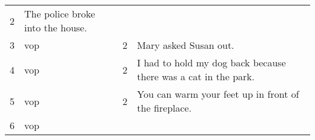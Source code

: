 \documentclass[authoryear,a4paper, 14pt]{scrartcl}
\begin{document}
\begin{longtable}[]{@{}llll@{}}
\begin{minipage}[t]{0.09\columnwidth}
2\strut
\end{minipage} & \begin{minipage}[t]{0.63\columnwidth}\raggedright
The police broke into the house.\strut
\end{minipage}\tabularnewline
\begin{minipage}[t]{0.08\columnwidth}\raggedright
3\strut
\end{minipage} & \begin{minipage}[t]{0.09\columnwidth}\raggedright
vop\strut
\end{minipage} & \begin{minipage}[t]{0.09\columnwidth}\raggedright
2\strut
\end{minipage} & \begin{minipage}[t]{0.63\columnwidth}\raggedright
Mary asked Susan out.\strut
\end{minipage}\tabularnewline
\begin{minipage}[t]{0.08\columnwidth}\raggedright
4\strut
\end{minipage} & \begin{minipage}[t]{0.09\columnwidth}\raggedright
vop\strut
\end{minipage} & \begin{minipage}[t]{0.09\columnwidth}\raggedright
2\strut
\end{minipage} & \begin{minipage}[t]{0.63\columnwidth}\raggedright
I had to hold my dog back because there was a cat in the park.\strut
\end{minipage}\tabularnewline
\begin{minipage}[t]{0.08\columnwidth}\raggedright
5\strut
\end{minipage} & \begin{minipage}[t]{0.09\columnwidth}\raggedright
vop\strut
\end{minipage} & \begin{minipage}[t]{0.09\columnwidth}\raggedright
2\strut
\end{minipage} & \begin{minipage}[t]{0.63\columnwidth}\raggedright
You can warm your feet up in front of the fireplace.\strut
\end{minipage}\tabularnewline
\begin{minipage}[t]{0.08\columnwidth}\raggedright
6\strut
\end{minipage} & \begin{minipage}[t]{0.09\columnwidth}\raggedright
vop\strut
\end{minipage} & \begin{minipage}[t]{0.09\columnwidth}\raggedright

\end{minipage}
\end{longtable}
\end{document}
